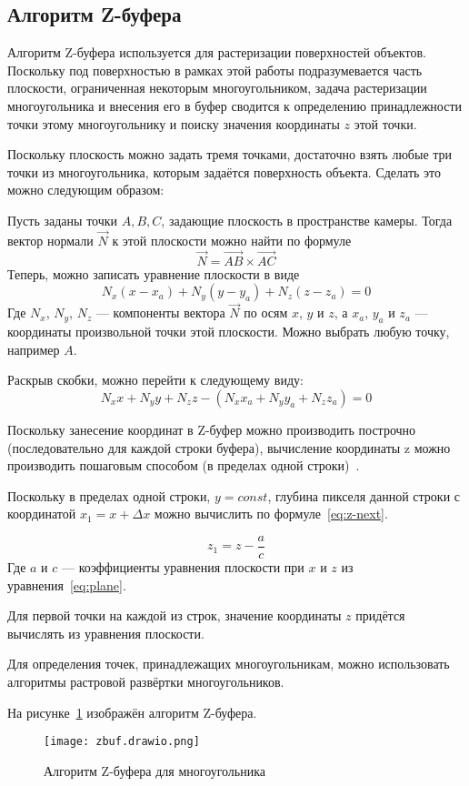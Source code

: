 \subsection{Алгоритм Z-буфера}

Алгоритм Z-буфера используется для растеризации поверхностей объектов. Поскольку под поверхностью в рамках этой работы подразумевается часть плоскости, ограниченная некоторым многоугольником, задача растеризации многоугольника и внесения его в буфер сводится к определению принадлежности точки этому многоугольнику и поиску значения координаты $z$ этой точки.

Поскольку плоскость можно задать тремя точками, достаточно взять любые три точки из многоугольника, которым задаётся поверхность объекта. Сделать это можно следующим образом:

Пусть заданы точки $A, B, C$, задающие плоскость в пространстве камеры. Тогда вектор нормали $\vec{N}$ к этой плоскости можно найти по формуле
$$ \vec{N} = \vec{AB} \times \vec{AC} $$
Теперь, можно записать уравнение плоскости в виде
$$ N_x(x-x_a) + N_y(y-y_a) + N_z(z-z_a) = 0 $$
Где $N_x$, $N_y$, $N_z$ --- компоненты вектора $\vec{N}$ по осям $x$, $y$ и $z$, а $x_a$, $y_a$ и $z_a$ --- координаты произвольной точки этой плоскости. Можно выбрать любую точку, например $A$.

Раскрыв скобки, можно перейти к следующему виду:
\begin{equation}
    N_xx + N_yy + N_zz - (N_xx_a + N_yy_a + N_zz_a) = 0
    \label{eq:plane}
\end{equation}

Поскольку занесение координат в Z-буфер можно производить построчно (последовательно для каждой строки буфера), вычисление координаты z можно производить пошаговым способом (в пределах одной строки)~\cite{Rogers}.

Поскольку в пределах одной строки, $y = const$, глубина пикселя данной строки с координатой $x_1 = x + \Delta x$ можно вычислить по формуле~\ref{eq:z-next}.

\begin{equation}
    z_1 = z - \frac{ a}{ c}
    \label{eq:z-next}
\end{equation}
Где $a$ и $c$ --- коэффициенты уравнения плоскости при $x$ и $z$ из уравнения~\ref{eq:plane}.

Для первой точки на каждой из строк, значение координаты $z$ придётся вычислять из уравнения плоскости.

Для определения точек, принадлежащих многоугольникам, можно использовать алгоритмы растровой развёртки многоугольников.

На рисунке~\ref{fig:z-buffer} изображён алгоритм Z-буфера.

\begin{figure}[h!]
    \centering
    \texttt{[image: zbuf.drawio.png]}
    \caption{Алгоритм Z-буфера для многоугольника}
    \label{fig:z-buffer}
\end{figure}